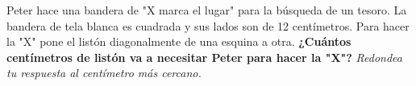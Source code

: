 Peter hace una bandera de "X marca el lugar" para la búsqueda de un tesoro.
La bandera de tela blanca es cuadrada y sus lados son de 12 centímetros.
Para hacer la "X" pone el listón diagonalmente de una esquina a otra.
\textbf{¿Cuántos centímetros de listón va a necesitar Peter para hacer la "X"?}
\textit{Redondea tu respuesta al centímetro más cercano.}